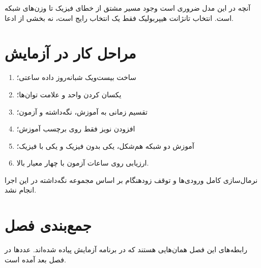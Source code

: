 آنچه در این مدل ضروری است وجود مسیر مشتق از خطای فیزیک تا وزن‌های شبکه است. انتخاب تانژانت هیپربولیک فقط یک انتخاب رایج است، نه بخشی از ادعا.

\section{مراحل کار در آزمایش}
\begin{enumerate}
  \item ساخت بیست‌ویک شبانه‌روز داده ساعتی؛
  \item یکسان کردن واحد و علامت توان‌ها؛
  \item تقسیم زمانی به آموزش، نگه‌داشته و آزمون؛
  \item افزودن نویز فقط روی برچسب آموزش؛
  \item آموزش دو شبکه هم‌شکل، یکی بدون فیزیک و یکی با فیزیک؛
  \item ارزیابی روی ساعات آزمون با چهار معیار بالا.
\end{enumerate}
نرمال‌سازی کامل ورودی‌ها و توقف زودهنگام بر اساس مجموعه نگه‌داشته در این اجرا انجام نشد.

\section{جمع‌بندی فصل}
رابطه‌های این فصل همان‌هایی هستند که در برنامه آزمایش پیاده شده‌اند. عددها در فصل بعد آمده است.
